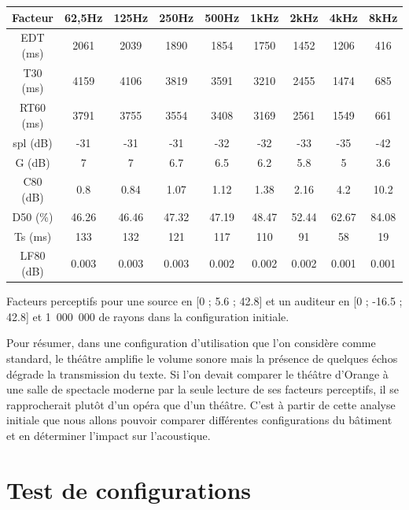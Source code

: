 \begin{tableth} 
 \begin{tabular}{| *{9}{c|}} 
 \hline 
 Facteur & 62,5Hz & 125Hz & 250Hz & 500Hz & 1kHz & 2kHz & 4kHz & 8kHz \\ 
 \hline 
 \hline 
\gls{EDT} (ms)& 2061& 2039& 1890& 1854& 1750& 1452& 1206& 416 \\ 
 \hline 
\gls{T30} (ms)& 4159& 4106& 3819& 3591& 3210& 2455& 1474& 685 \\ 
 \hline 
\gls{RT60} (ms)& 3791& 3755& 3554& 3408& 3169& 2561& 1549& 661 \\ 
 \hline 
\gls{spl} (dB)& -31& -31& -31& -32& -32& -33& -35& -42 \\ 
 \hline 
\gls{G} (dB)& 7& 7& 6.7& 6.5& 6.2& 5.8& 5& 3.6 \\ 
 \hline 
\gls{C80} (dB)& 0.8& 0.84& 1.07& 1.12& 1.38& 2.16& 4.2& 10.2 \\ 
 \hline 
\gls{D50} (\%)& 46.26& 46.46& 47.32& 47.19& 48.47& 52.44& 62.67& 84.08 \\ 
 \hline 
\gls{Ts} (ms)& 133& 132& 121& 117& 110& 91& 58& 19 \\ 
 \hline 
\gls{LF80} (dB)& 0.003& 0.003& 0.003& 0.002& 0.002& 0.002& 0.001& 0.001 \\ 
 \hline 
\end{tabular}
 \caption{Facteurs perceptifs pour une source en [0 ; 5.6 ; 42.8] et un auditeur en [0 ; -16.5 ; 42.8] et 1~000~000 de rayons dans la configuration initiale.} 
 \label{tab_fact_init} 
 \end{tableth}

Pour résumer, dans une configuration d'utilisation que l'on considère comme standard, le théâtre amplifie le volume sonore mais la présence de quelques échos dégrade la transmission du texte. Si l'on devait comparer le théâtre d'Orange à une salle de spectacle moderne par la seule lecture de ses facteurs perceptifs, il se rapprocherait plutôt d'un opéra que d'un théâtre. C'est  à partir de cette analyse initiale que nous allons pouvoir comparer différentes configurations du bâtiment et en déterminer l'impact sur l'acoustique.


		
\chapter{Test de configurations}
	\minitoc
	\newpage

